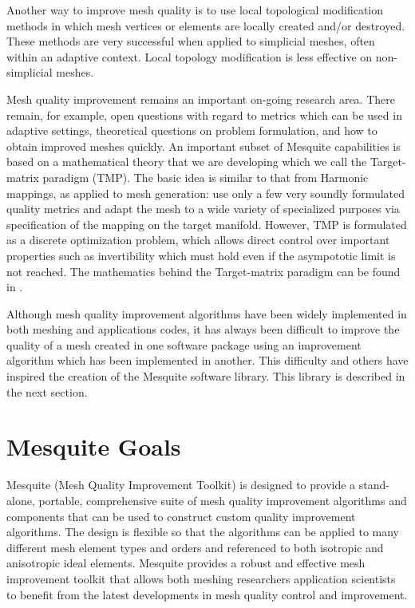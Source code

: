Another way to improve mesh quality is to use local topological modification methods in which mesh vertices or elements are locally created and/or destroyed. These methods are very successful when applied to simplicial meshes, often within an adaptive context.  Local topology modification is less effective on non-simplicial meshes. \newline

Mesh quality improvement remains an important on-going research area. 
There remain, for example, open questions with regard to metrics which 
can be used in adaptive settings, theoretical questions on problem 
formulation, and how to obtain improved meshes quickly. An important 
subset of Mesquite capabilities is based on a mathematical theory that we
are developing which we call the Target-matrix paradigm (TMP).  The
basic idea is similar to that from Harmonic mappings, as applied to mesh
generation: use only a few very soundly formulated quality metrics and 
adapt the mesh to a wide variety of specialized purposes via specification 
of the mapping on the target manifold. However, TMP is formulated as a 
discrete optimization problem, which allows direct control over important
properties such as invertibility which must hold even if the asympototic limit
is not reached. The mathematics behind the Target-matrix 
paradigm can be found in \cite{formal,local2dmetrics,convexity,analysis2D,labelinv,labelinv-imr,tgtcons}. \newline

Although mesh quality improvement algorithms have been widely implemented 
in both meshing and applications codes, it has always been difficult to 
improve the quality of a mesh created in one software package using an 
improvement algorithm which has been implemented in another.  This difficulty
and others have inspired the creation of the Mesquite software library. 
This library is described in the next section. \newline


\section{Mesquite Goals}
Mesquite (Mesh Quality Improvement Toolkit) is designed to provide a
stand-alone, portable, comprehensive suite of mesh quality improvement
algorithms and components that can be used to construct custom quality
improvement algorithms.  
The design is flexible so that the algorithms can be applied to many
different mesh element types and orders and referenced to both
isotropic and anisotropic ideal elements.  Mesquite provides a robust
and effective mesh improvement toolkit that allows both meshing
researchers application scientists to benefit from the latest
developments in mesh quality control and improvement. \newline

